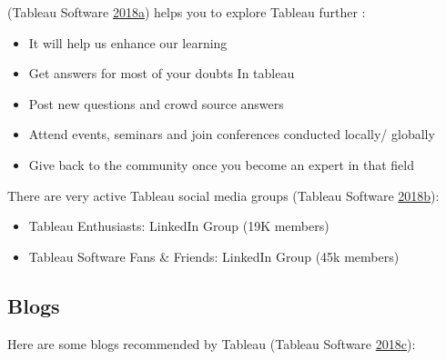 \documentclass[]{book}
\providecommand{\tightlist}{%
  \setlength{\itemsep}{0pt}\setlength{\parskip}{0pt}}
\theoremstyle{definition}
\theoremstyle{definition}
\theoremstyle{definition}
\theoremstyle{remark}
\begin{document}
(Tableau Software
\protect\hyperlink{ref-Tableau_Community}{2018}\protect\hyperlink{ref-Tableau_Community}{a})
helps you to explore Tableau further :

\begin{itemize}
\tightlist
\item
  It will help us enhance our learning
\item
  Get answers for most of your doubts In tableau
\item
  Post new questions and crowd source answers
\item
  Attend events, seminars and join conferences conducted locally/
  globally
\item
  Give back to the community once you become an expert in that field
\end{itemize}

There are very active Tableau social media groups (Tableau Software
\protect\hyperlink{ref-LinkedIn_Groups}{2018}\protect\hyperlink{ref-LinkedIn_Groups}{b}):

\begin{itemize}
\tightlist
\item
  Tableau Enthusiasts: LinkedIn Group (19K members)
\item
  Tableau Software Fans \& Friends: LinkedIn Group (45k members)
\end{itemize}

\subsection{Blogs}\label{blogs}

Here are some blogs recommended by Tableau (Tableau Software
\protect\hyperlink{ref-Top_10_Blogs}{2018}\protect\hyperlink{ref-Top_10_Blogs}{c}):
\end{document}
